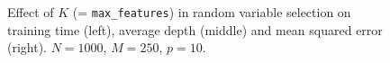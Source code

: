 \begin{figure}
\hspace{-4cm}
\caption{Effect of $K$ (= \texttt{max\_features}) in random variable selection on training time (left), average depth (middle) and mean squared error (right). $N=1000$, $M=250$, $p=10$.}
\label{fig:5:artificial:K}
\end{figure}

